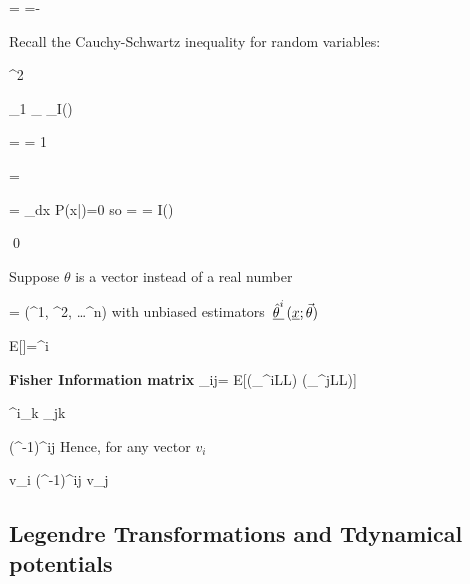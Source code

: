 \beq
\av{\rva, \rvb}=
\av{\Delta \rva, \Delta \rvb}=\av{\rva \;\rvb}-\av{\rva}\av{\rvb}
\eeq

Recall the Cauchy-Schwartz inequality for
random variables:

\beq
\av{\rva, \rvb}^2
\leq \av{\rva, \rva}\av{\rvb, \rvb}
\eeq


\beq
{}_{1}\leq 
\underbrace{\av{\rv{\htheta}-\theta,\rv{\htheta}-\theta}}_{\av{\rv{\htheta}, \rv{\htheta}}}
_{I(\theta)}
\eeq


\beq
{}=
= 1
\eeq

\beq
\av{\rv{\htheta}-\theta,\rv{\htheta}-\theta}=
\av{\rv{\htheta},\rv{\htheta}}
\eeq

\beq
{}=
\partial_\theta\int dx\; P(x|\theta)=0
\eeq
so 
\beq
{}= = I(\theta)
\eeq


\qed

Suppose 
$\theta$ is a vector instead of a real number

\beq
\vec{\theta} = (\theta^1, \theta^2, \ldots \theta^n)
\eeq
with unbiased estimators $\rv{\htheta^i}(\rvx;\vec{\theta})$

\beq
E[]=\theta^i
\eeq

{\bf Fisher Information matrix}
\beq
\metric_{ij}=
E[\;(\partial_{\theta^i}LL)\;
(\partial_{\theta^j}LL)\;]
\eeq

\beq
\delta^i_k\leq
{}\metric_{jk}
\eeq

\beq
(\metric^{-1})^{ij}\leq {}
\eeq
Hence, for
any vector $v_i$

\beq
v_i (\metric^{-1})^{ij}
v_j
\leq
{}
\eeq


\subsection{Legendre Transformations and Tdynamical potentials}



